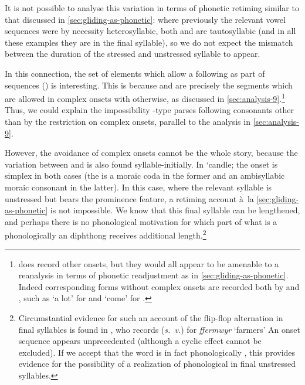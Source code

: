 It is not possible to analyse this variation in terms of phonetic retiming similar to that discussed in \cref{sec:gliding-as-phonetic}: where previously the relevant vowel sequences were by necessity heterosyllabic, both \ipa{[ui]} and \ipa{[iu]} are tautosyllabic (and in all these examples they are in the final syllable), so we do not expect the mismatch between the duration of the stressed and unstressed syllable to appear.

In this connection, the set of elements which allow a following \ipa{[w]} as part of  sequences (\ipa{[ɡ~h~$\emptyset$]}) is interesting. This is because \ipa{[ɡ]} and \ipa{[h]} are precisely the segments which are allowed in complex onsets with \ipa{[w]} otherwise, as discussed in \cref{sec:analysis-9}.\footnote{\citet{awbery86:_pembr_welsh} does record other \ipa{[C(C)w]} onsets, but they would all appear to be amenable to a reanalysis in terms of phonetic readjustment as in \cref{sec:gliding-as-phonetic}. Indeed corresponding forms without complex onsets are recorded both by \citet{awbery86:_pembr_welsh} and \citet{thomas00:_welsh}, such as \ipa{[ˈpuːer]} `a lot' \citep[\emph{sub voce}]{thomas00:_welsh} for  \ipa{[ˈpweːr]} and \ipa{[ˈduːad]} `come' \citep[\emph{s.~v.~dyfod}]{thomas00:_welsh} for \ipa{[ˈdwaːd]}.} Thus, we could  explain the impossibility \ipa{[wi]}-type parses following consonants other than \ipa{[ɡ~h]} by the restriction on complex onsets, parallel to the analysis in \cref{sec:analysis-9}.

However, the avoidance of complex onsets cannot be the whole story, because the variation between \ipa{[ui]} and \ipa{[wi]} is also found syllable\hyp initially. In \alternation{[ˈkanwiɬ]}{[ˈkanuiɬ]} `candle; the onset is simplex in both cases (the \ipa{[n]} is a moraic coda in the former and an ambisyllabic moraic consonant in the latter). In this case, where the relevant syllable is unstressed but bears the prominence feature, a retiming account à~la \cref{sec:gliding-as-phonetic} is not impossible. We know that this final syllable can be lengthened, and perhaps there is no phonological motivation for which part of what is a phonologically an \ipa{[ui]} diphthong receives additional length.\footnote{Circumstantial evidence for such an account of the flip-flop alternation in final syllables is found in \citet{thomas00:_welsh}, who records \ipa{[ˈfermwir]} (\emph{s.~v.}) for \emph{ffermwyr} `farmers' An onset sequence \ipa{[mw]} appears unprecedented (although a cyclic effect cannot be excluded). If we accept that the word is in fact phonologically \ipa{[ˈfermuir]}, this provides evidence for the possibility of a  realization of phonological \ipa{[ui]} in final unstressed syllables.}

